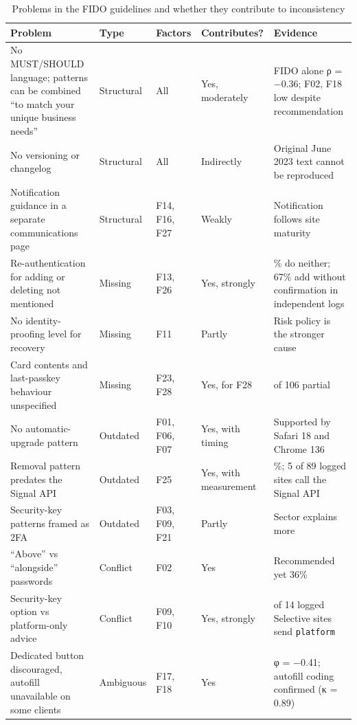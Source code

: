 \documentclass[letterpaper,twocolumn,10pt]{article}
\begin{document}
\begin{table}[t]\centering\scriptsize\setlength{\tabcolsep}{3pt}\caption{Problems in the FIDO guidelines and whether they contribute to inconsistency}\label{tab:5}
\begin{tabularx}{\textwidth}{>{\raggedright\arraybackslash}X>{\raggedright\arraybackslash}p{1.4cm}>{\raggedright\arraybackslash}p{1.6cm}>{\raggedright\arraybackslash}p{2cm}>{\raggedright\arraybackslash}X}\toprule
\textbf{Problem} & \textbf{Type} & \textbf{Factors} & \textbf{Contributes?} & \textbf{Evidence} \\ \midrule
No MUST/SHOULD language; patterns can be combined ``to match your unique business needs'' & Structural & All & Yes, moderately & FIDO alone ρ = −0.36; F02, F18 low despite recommendation \\
No versioning or changelog & Structural & All & Indirectly & Original June 2023 text cannot be reproduced \\
Notification guidance in a separate communications page & Structural & F14, F16, F27 & Weakly & Notification follows site maturity \\
Re-authentication for adding or deleting not mentioned & Missing & F13, F26 & Yes, strongly & 65\% do neither; 67\% add without confirmation in independent logs \\
No identity-proofing level for recovery & Missing & F11 & Partly & Risk policy is the stronger cause \\
Card contents and last-passkey behaviour unspecified & Missing & F23, F28 & Yes, for F28 & 83 of 106 partial \\
No automatic-upgrade pattern & Outdated & F01, F06, F07 & Yes, with timing & Supported by Safari 18 and Chrome 136 \\
Removal pattern predates the Signal API & Outdated & F25 & Yes, with measurement & 23\%; 5 of 89 logged sites call the Signal API \\
Security-key patterns framed as 2FA & Outdated & F03, F09, F21 & Partly & Sector explains more \\
``Above'' vs ``alongside'' passwords & Conflict & F02 & Yes & Recommended yet 36\% \\
Security-key option vs platform-only advice & Conflict & F09, F10 & Yes, strongly & 13 of 14 logged Selective sites send \texttt{platform} \\
Dedicated button discouraged, autofill unavailable on some clients & Ambiguous & F17, F18 & Yes & φ = −0.41; autofill coding confirmed (κ = 0.89) \\
\bottomrule\end{tabularx}\end{table}
\end{document}
